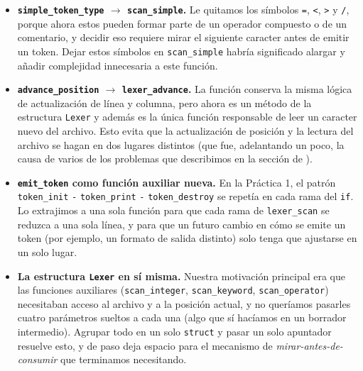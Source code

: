\documentclass[12pt,letterpaper]{article}
\begin{document}
\begin{itemize}
\item \textbf{\texttt{simple\_token\_type} $\rightarrow$ \texttt{scan\_simple}.} Le quitamos los símbolos
  \texttt{=}, \texttt{<}, \texttt{>} y \texttt{/}, porque ahora estos pueden formar parte de un operador
  compuesto o de un comentario, y decidir eso requiere mirar el siguiente caracter antes de emitir un
  token. Dejar estos símbolos en \texttt{scan\_simple} habría significado alargar y añadir complejidad
  innecesaria a este función.
  
\item \textbf{\texttt{advance\_position} $\rightarrow$ \texttt{lexer\_advance}.} La función conserva la misma
  lógica de actualización de línea y columna, pero ahora es un método de la estructura \texttt{Lexer} y
  además es la única función responsable de leer un caracter nuevo del archivo. Esto evita que la
  actualización de posición y la lectura del archivo se hagan en dos lugares distintos (que fue,
  adelantando un poco, la causa de varios de los problemas que describimos en la sección de
  ).
  
\item \textbf{\texttt{emit\_token} como función auxiliar nueva.} En la Práctica 1, el patrón
  \texttt{token\_init} \texttt{-} \texttt{token\_print} \texttt{-} \texttt{token\_destroy} se repetía en cada
  rama del \texttt{if}. Lo extrajimos a una sola función para que cada rama de \texttt{lexer\_scan} se reduzca a
  una sola línea, y para que un futuro cambio en cómo se emite un token (por ejemplo, un formato de
  salida distinto) solo tenga que ajustarse en un solo lugar.
  
\item \textbf{La estructura \texttt{Lexer} en sí misma.} Nuestra motivación principal era que las funciones
  auxiliares (\texttt{scan\_integer}, \texttt{scan\_keyword}, \texttt{scan\_operator}) necesitaban acceso
  al archivo y a la posición actual, y no queríamos pasarles cuatro parámetros sueltos a cada una (algo
  que sí hacíamos en un borrador intermedio). Agrupar todo en un solo \texttt{struct} y pasar un solo
  apuntador resuelve esto, y de paso deja espacio para el mecanismo de \textit{mirar-antes-de-consumir} que
  terminamos necesitando.
\end{itemize}


\newpage

\end{document}
